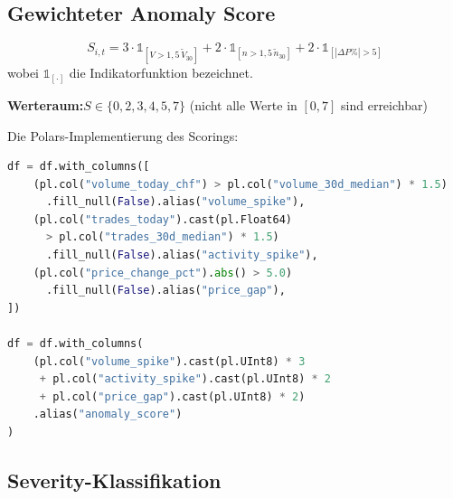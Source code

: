 \documentclass[11pt, a4paper, oneside, openany]{report}
\newcommand{\code}[1]{{\codefont\small\textcolor{DeepNavy}{#1}}}
\begin{document}
\subsection{Gewichteter Anomaly Score}

\begin{mathbox}
\[
  \boxed{\;S_{i,t} = 3 \cdot \mathbb{1}_{\left[V > 1{,}5\,\tilde{V}_{30}\right]} + 2 \cdot \mathbb{1}_{\left[n > 1{,}5\,\tilde{n}_{30}\right]} + 2 \cdot \mathbb{1}_{\left[|\Delta P\%| > 5\right]}\;}
\]
wobei $\mathbb{1}_{[\cdot]}$ die Indikatorfunktion bezeichnet.

\textbf{Werteraum:}\;$S \in \{0, 2, 3, 4, 5, 7\}$ (nicht alle Werte in $[0,7]$ sind erreichbar)
\end{mathbox}

\noindent Die Polars-Implementierung des Scorings:

\begin{lstlisting}[language=Python, caption={Anomalie-Scoring in Polars (\code{metrics.py})}]
df = df.with_columns([
    (pl.col("volume_today_chf") > pl.col("volume_30d_median") * 1.5)
      .fill_null(False).alias("volume_spike"),
    (pl.col("trades_today").cast(pl.Float64)
      > pl.col("trades_30d_median") * 1.5)
      .fill_null(False).alias("activity_spike"),
    (pl.col("price_change_pct").abs() > 5.0)
      .fill_null(False).alias("price_gap"),
])

df = df.with_columns(
    (pl.col("volume_spike").cast(pl.UInt8) * 3
     + pl.col("activity_spike").cast(pl.UInt8) * 2
     + pl.col("price_gap").cast(pl.UInt8) * 2)
    .alias("anomaly_score")
)
\end{lstlisting}

\subsection{Severity-Klassifikation}
\end{document}
